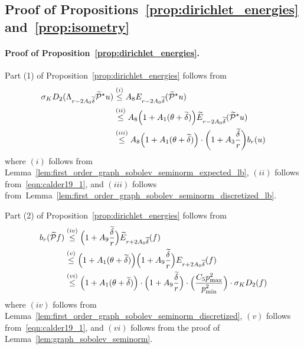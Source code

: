 \documentclass[twoside]{article}
\newcommand{\1}{\mathbf{1}}
\newcommand{\mc}[1]{\mathcal{#1}}
\newcommand{\wt}[1]{\widetilde{#1}}
\theoremstyle{definition}
\theoremstyle{remark}
\begin{document}
\subsection{Proof of Propositions~\ref{prop:dirichlet_energies} and~\ref{prop:isometry}}
\label{subsec:proof_of_prop_dirichlet_energies_and_isometry}

\paragraph{Proof of Proposition~\ref{prop:dirichlet_energies}.}
Part (1) of Proposition~\ref{prop:dirichlet_energies} follows from
\begin{align*}
\sigma_K D_2(\Lambda_{r - 2A_0\wt{\delta}} \wt{\mc{P}}^{\star}u) & \overset{(i)}{\leq} A_8 E_{r - 2A_0\wt{\delta}}(\wt{\mc{P}}^{\star}u) \\
& \overset{(ii)}{\leq} A_8 \Bigl(1 + A_1(\theta + \wt{\delta})\Bigr) \wt{E}_{r - 2A_0\wt{\delta}}(\wt{\mc{P}}^{\star}u) \\
& \overset{(iii)}{\leq} A_8 \Bigl(1 + A_1(\theta + \wt{\delta})\Bigr) \cdot \biggl(1 + A_3\frac{\wt{\delta}}{r}\biggr) b_r(u)
\end{align*}
where $(i)$ follows from Lemma~\ref{lem:first_order_graph_sobolev_seminorm_expected_lb}, $(ii)$ follows from~\eqref{eqn:calder19_1}, and $(iii)$ follows from~Lemma~\ref{lem:first_order_graph_sobolev_seminorm_discretized_lb}.

Part (2) of Proposition~\ref{prop:dirichlet_energies} follows from
\begin{align*}
b_r(\wt{\mc{P}}f) & \overset{(iv)}{\leq} \Bigl(1 + A_9\frac{\wt{\delta}}{r}\Bigr)\wt{E}_{r + 2A_0\wt{\delta}}(f)\\
& \overset{(v)}{\leq} \Bigl(1 + A_1(\theta + \wt{\delta})\Bigr) \Bigl(1 + A_9\frac{\wt{\delta}}{r}\Bigr){E}_{r + 2A_0\wt{\delta}}(f) \\
& \overset{(vi)}{\leq} \Bigl(1 + A_1(\theta + \wt{\delta})\Bigr) \cdot \Bigl(1 + A_9\frac{\wt{\delta}}{r}\Bigr) \cdot \Bigl(\frac{C_5 p_{\max}^2}{p_{\min}^2}\Bigr) \cdot \sigma_{K} D_2(f)
\end{align*}
where $(iv)$ follows from Lemma~\ref{lem:first_order_graph_sobolev_seminorm_discretized}, $(v)$ follows from~\eqref{eqn:calder19_1}, and $(vi)$ follows from the proof of Lemma~\ref{lem:graph_sobolev_seminorm}.
\end{document}
